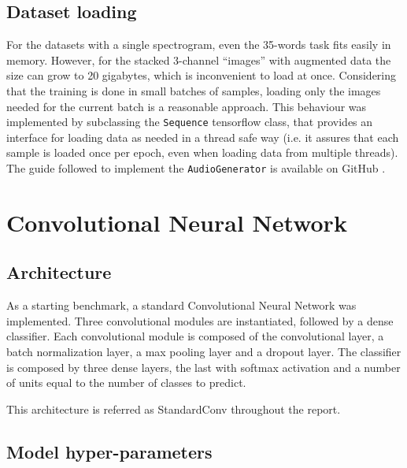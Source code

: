 

\subsection{Dataset loading}

For the datasets with a single spectrogram, even the 35-words task fits easily
in memory. However, for the stacked 3-channel ``images'' with augmented data
the size can grow to 20 gigabytes, which is inconvenient to load at once.
Considering that the training is done in small batches of samples, loading only
the images needed for the current batch is a reasonable approach.
%
This behaviour was implemented by subclassing the \texttt{Sequence} tensorflow
class, that provides an interface for loading data as needed in a thread safe
way (i.e. it assures that each sample is loaded once per epoch, even when
loading data from multiple threads).
%
The guide followed to implement the \texttt{AudioGenerator} is available on
GitHub \cite{afshineaKDG}.

\section{Convolutional Neural Network}
\label{sec:convolutional_arch}

\subsection{Architecture}

As a starting benchmark, a standard Convolutional Neural Network was
implemented.
%
Three convolutional modules are instantiated, followed by a dense classifier.
%
Each convolutional module is composed of the convolutional layer, a batch
normalization layer, a max pooling layer and a dropout layer.
%
The classifier is composed by three dense layers, the last with softmax
activation and a number of units equal to the number of classes to predict.

This architecture is referred as StandardConv throughout the report.

\subsection{Model hyper-parameters}

